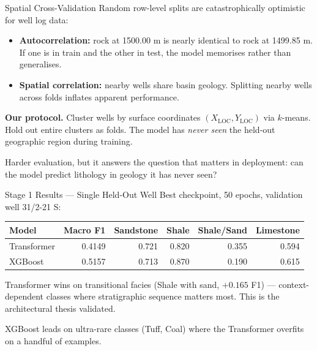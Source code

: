 \documentclass[aspectratio=169,11pt]{beamer}
\newcommand{\acc}[1]{{\color{Accent}#1}}
\newcommand{\mut}[1]{{\color{Muted}#1}}
\begin{document}
\begin{frame}{Spatial Cross-Validation}
  Random row-level splits are \acc{catastrophically optimistic} for well log data:

  \vspace{0.4em}
  \begin{itemize}
    \item \textbf{Autocorrelation:} rock at 1500.00 m is nearly identical to rock at 1499.85 m. If one is in train and the other in test, the model memorises rather than generalises.
    \item \textbf{Spatial correlation:} nearby wells share basin geology. Splitting nearby wells across folds inflates apparent performance.
  \end{itemize}

  \vspace{0.6em}
  \textbf{Our protocol.} Cluster wells by surface coordinates $(X_\text{LOC}, Y_\text{LOC})$ via $k$-means. Hold out entire clusters as folds. The model has \emph{never seen} the held-out geographic region during training.

  \vspace{0.6em}
  \mut{Harder evaluation, but it answers the question that matters in deployment: can the model predict lithology in geology it has never seen?}
\end{frame}

\begin{frame}{Stage 1 Results — Single Held-Out Well}
  Best checkpoint, 50 epochs, validation well 31/2-21 S:

  \vspace{0.6em}
  \begin{footnotesize}
  \begin{tabular}{l r r r r r}
    \toprule
    \textbf{Model} & \textbf{Macro F1} & \textbf{Sandstone} & \textbf{Shale} & \textbf{Shale/Sand} & \textbf{Limestone}\\
    \midrule
    Transformer & 0.4149 & 0.721 & 0.820 & \acc{0.355} & 0.594\\
    XGBoost     & 0.5157 & 0.713 & 0.870 & 0.190        & 0.615\\
    \bottomrule
  \end{tabular}
  \end{footnotesize}

  \vspace{1em}
  \acc{Transformer wins on transitional facies} (Shale with sand, $+0.165$ F1) — context-dependent classes where stratigraphic sequence matters most. This is the architectural thesis validated.

  \vspace{0.4em}
  \mut{XGBoost leads on ultra-rare classes (Tuff, Coal) where the Transformer overfits on a handful of examples.}
\end{frame}
\end{document}
